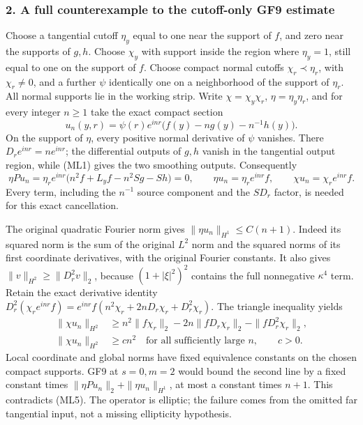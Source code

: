 \documentclass[
  11pt,
]{article}
\begin{document}
\subsubsection{2. A full counterexample to the cutoff-only GF9
estimate}\label{a-full-counterexample-to-the-cutoff-only-gf9-estimate}

Choose a tangential cutoff \(\eta_y\) equal to one near the support of
\(f\), and zero near the supports of \(g,h\). Choose \(\chi_y\) with
support inside the region where \(\eta_y=1\), still equal to one on the
support of \(f\). Choose compact normal cutoffs \(\chi_r\prec\eta_r\),
with \(\chi_r\ne0\), and a further \(\psi\) identically one on a
neighborhood of the support of \(\eta_r\). All normal supports lie in
the working strip. Write \(\chi=\chi_y\chi_r\), \(\eta=\eta_y\eta_r\),
and for every integer \(n\geq1\) take the exact compact section \[
 u_n(y,r)=\psi(r)e^{inr}
       \bigl(f(y)-n g(y)-n^{-1}h(y)\bigr).
 \tag{ML3}
\] On the support of \(\eta\), every positive normal derivative of
\(\psi\) vanishes. There \(D_r e^{inr}=n e^{inr}\); the differential
outputs of \(g,h\) vanish in the tangential output region, while (ML1)
gives the two smoothing outputs. Consequently \[
 \eta Pu_n=\eta_r e^{inr}
       \bigl(n^2f+L_yf-n^2Sg-Sh\bigr)=0,
 \qquad
 \eta u_n=\eta_r e^{inr}f,
 \qquad
 \chi u_n=\chi_r e^{inr}f.
 \tag{ML4}
\] Every term, including the \(n^{-1}\) source component and the
\(SD_r\) factor, is needed for this exact cancellation.

The original quadratic Fourier norm gives
\(\|\eta u_n\|_{H^1}\leq C(n+1)\). Indeed its squared norm is the sum of
the original \(L^2\) norm and the squared norms of its first coordinate
derivatives, with the original Fourier constants. It also gives
\(\|v\|_{H^2}\geq\|D_r^2v\|_2\), because \((1+|\xi|^2)^2\) contains the
full nonnegative \(\kappa^4\) term. Retain the exact derivative identity
\(D_r^2(\chi_r e^{inr}f)=e^{inr}f(n^2\chi_r+2nD_r\chi_r+D_r^2\chi_r)\).
The triangle inequality yields \[
 \begin{split}
 \|\chi u_n\|_{H^2}
 &\geq n^2\|f\chi_r\|_2
        -2n\|fD_r\chi_r\|_2
        -\|fD_r^2\chi_r\|_2,\\
 \|\chi u_n\|_{H^2}&\geq c n^2
       \quad\text{for all sufficiently large }n,\qquad c>0.
 \end{split}
 \tag{ML5}
\] Local coordinate and global norms have fixed equivalence constants on
the chosen compact supports. GF9 at \(s=0,m=2\) would bound the second
line by a fixed constant times \(\|\eta Pu_n\|_2+\|\eta u_n\|_{H^1}\),
at most a constant times \(n+1\). This contradicts (ML5). The operator
is elliptic; the failure comes from the omitted far tangential input,
not a missing ellipticity hypothesis.
\end{document}
